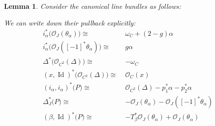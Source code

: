 \documentclass[reqno,11pt]{amsart}
\numberwithin{equation}{section}
\theoremstyle{plain}
\newtheorem{lemma}[theorem]{Lemma}
\theoremstyle{plain}
\numberwithin{equation}{section}
\theoremstyle{remark}
\DeclareMathOperator{\Id}{\operatorname{Id}}
\begin{document}
\begin{lemma}
Consider the canonical line bundles as follows:
\begin{center}
\end{center}
We can write down their pullback explicitly:
\begin{equation}
\begin{aligned}
  i_{\alpha}^* \Big(\mathcal{O}_J(\theta_{\alpha}) \Big)\cong\;& \omega_C+(2-g)\alpha  \\ 
  i_{\alpha}^* \Big(\mathcal{O}_J([-1]^* \theta_{\alpha}) \Big)\cong\;& g\alpha \\   
  \Delta^* \Big(\mathcal{O}_{C^2}(\Delta) \Big)\cong\;& -\omega_C \\ 
  (x,\Id)^* \Big(\mathcal{O}_{C^2}(\Delta) \Big)\cong\;& \mathcal{O}_C(x) \\  
  (i_{\alpha},i_{\alpha})^* \big(P\big)\cong\;&  \mathcal{O}_{C^2}(\Delta)-p_1^*\alpha-p_2^*\alpha\\  
  \Delta_J^* \big(P\big)\cong\;&-\mathcal{O}_J(\theta_{\alpha})- \mathcal{O}_J([-1]^* \theta_{\alpha}) \\ 
  (\beta,\Id)^* \big(P\big)\cong\;& -T_{\beta}^*\mathcal{O}_J(\theta_{\alpha})+\mathcal{O}_J(\theta_{\alpha}) \\ 
\end{aligned}
\end{equation}
\end{lemma}
\end{document}
